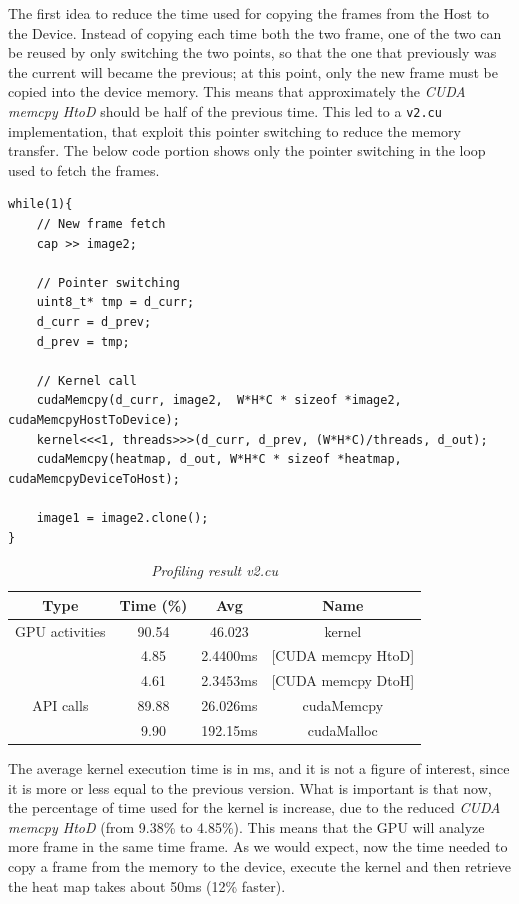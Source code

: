 \documentclass[paper=a4, fontsize=10pt]{scrartcl}	%
\begin{document}
	The first idea to reduce the time used for copying the frames from the Host to the Device. Instead of copying each time both the two frame, one of the two can be reused by only switching the two points, so that the one that previously was the current will became the previous; at this point, only the new frame must be copied into the device memory. This means that approximately the \textit{CUDA memcpy HtoD} should be half of the previous time. This led to a \texttt{v2.cu} implementation, that exploit this pointer switching to reduce the memory transfer. The below code portion shows only the pointer switching in the loop used to fetch the frames.
		\begin{lstlisting}[style=CStyle]
while(1){
	// New frame fetch
	cap >> image2;
	
	// Pointer switching
	uint8_t* tmp = d_curr;
	d_curr = d_prev;
	d_prev = tmp;
	
	// Kernel call
	cudaMemcpy(d_curr, image2,  W*H*C * sizeof *image2, cudaMemcpyHostToDevice);
	kernel<<<1, threads>>>(d_curr, d_prev, (W*H*C)/threads, d_out);
	cudaMemcpy(heatmap, d_out, W*H*C * sizeof *heatmap, cudaMemcpyDeviceToHost);
	
	image1 = image2.clone();
}\end{lstlisting}
	
	\begin{table}[H]
		\centering
		\begin{center}
			\begin{tabular}{ |c|c|c|c| } 
				\hline
				\textbf{Type} & \textbf{Time} (\%) & \textbf{Avg} & \textbf{Name} \\ 
				\hline
				GPU activities & 90.54 & 46.023 & kernel \\ 
				& 4.85 & 2.4400ms & [CUDA memcpy HtoD] \\ 
				& 4.61 & 2.3453ms & [CUDA memcpy DtoH] \\ 
				\hline
				API calls & 89.88 & 26.026ms & cudaMemcpy \\ 
				& 9.90 & 192.15ms & cudaMalloc \\ 
				\hline
			\end{tabular}
		\end{center}
		\label{fig:table_v2}
		\caption{\textit{Profiling result v2.cu}}
	\end{table}
	The average kernel execution time is in ms, and it is not a figure of interest, since it is more or less equal to the previous version. What is important is that now, the percentage of time used for the kernel is increase, due to the reduced \textit{CUDA memcpy HtoD} (from  9.38\% to 4.85\%). This means that the GPU will analyze more frame in the same time frame. As we would expect, now the time needed to copy a frame from the memory to the device, execute the kernel and then retrieve the heat map takes about 50ms (12\% faster).
	
\end{document}

